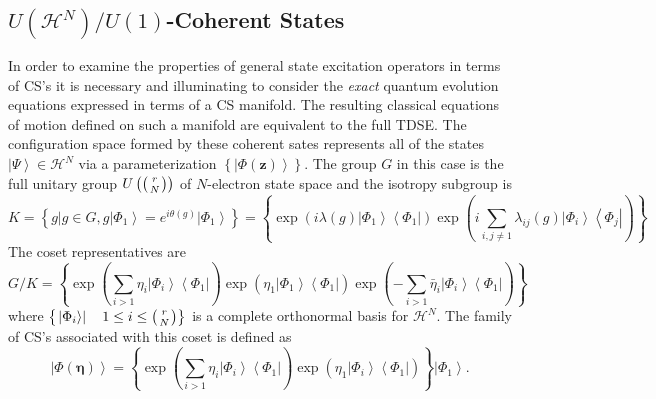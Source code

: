 \documentclass[aps,preprint]{revtex4}%
\begin{document}
\subsection{$U\left(  \mathcal{H}^{N}\right)  /U\left(  1\right)  $-Coherent
States}

In order to examine the properties of general state excitation operators in
terms of CS's it is necessary and illuminating to consider the \emph{exact
}quantum evolution equations expressed in terms of a CS manifold. The
resulting classical equations of motion defined on such a manifold are
equivalent to the full TDSE. The configuration space formed by these coherent
sates represents all of the states $\left\vert \Psi\right\rangle
\in\mathcal{H}^{N}$ via a parameterization $\left\{  \left\vert \Phi\left(
\mathbf{z}\right)  \right\rangle \right\}  $. The group $G$ in this case is
the full unitary group $U\left(  \left(
\genfrac{}{}{0pt}{}{r}{N}%
\right)  \right)  $ of $N$-electron state space and the isotropy subgroup is
\begin{equation}
K=\left\{  \left.  g\right\vert g\in G,g\left\vert \Phi_{1}\right\rangle
=e^{i\theta\left(  g\right)  }\left\vert \Phi_{1}\right\rangle \right\}
=\left\{  \exp\left(  i\lambda\left(  g\right)  \left\vert \Phi_{1}%
\right\rangle \left\langle \Phi_{1}\right\vert \right)  \exp\left(
i\sum_{i,j\neq1}\lambda_{ij}\left(  g\right)  \left\vert \Phi_{i}\right\rangle
\left\langle \Phi_{j}\right\vert \right)  \right\}
\end{equation}
The coset representatives are
\begin{equation}
G/K=\left\{  \exp\left(  \sum_{i>1}\eta_{i}\left\vert \Phi_{i}\right\rangle
\left\langle \Phi_{1}\right\vert \right)  \exp\left(  \eta_{1}\left\vert
\Phi_{1}\right\rangle \left\langle \Phi_{1}\right\vert \right)  \exp\left(
-\sum_{i>1}\bar{\eta}_{i}\left\vert \Phi_{i}\right\rangle \left\langle
\Phi_{1}\right\vert \right)  \right\}
\end{equation}
where $\left\{  \left.  \left\vert \Phi_{i}\right\rangle \right\vert
\quad1\leq i\leq\left(
\genfrac{}{}{0pt}{}{r}{N}%
\right)  \right\}  $ is a complete orthonormal basis for $\mathcal{H}^{N}$.
The family of CS's associated with this coset is defined as
\begin{equation}
\left\vert \Phi\left(  \mathbf{\eta}\right)  \right\rangle =\left\{
\exp\left(  \sum_{i>1}\eta_{i}\left\vert \Phi_{i}\right\rangle \left\langle
\Phi_{1}\right\vert \right)  \exp\left(  \eta_{1}\left\vert \Phi
_{i}\right\rangle \left\langle \Phi_{1}\right\vert \right)  \right\}
\left\vert \Phi_{1}\right\rangle .
\end{equation}
\end{document}
